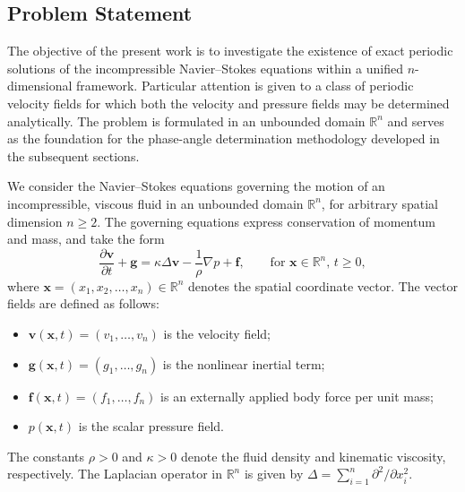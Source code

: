 \documentclass[11pt]{jfm}
\numberwithin{equation}{section}
\begin{document}
\subsection{Problem Statement}
The objective of the present work is to investigate the existence of exact periodic
solutions of the incompressible Navier--Stokes equations within a unified $n$-dimensional framework. Particular attention is given to a class of periodic velocity fields for which both the velocity and pressure fields may be determined analytically. The problem is formulated in an unbounded domain \( \mathbb{R}^n \) and serves as the foundation for the phase-angle determination methodology developed in the subsequent sections.

We consider the Navier--Stokes equations governing the motion of an incompressible, viscous fluid in an unbounded domain \( \mathbb{R}^n \), for arbitrary spatial dimension \( n \geq 2 \). The governing equations express conservation of momentum and mass, and take the form
\begin{equation}
\label{1.1}
\frac{\partial \boldsymbol{v}}{\partial t} + \boldsymbol{g} = \kappa \Delta \boldsymbol{v} - \frac{1}{\rho} \nabla p + \boldsymbol{f}, \qquad \text{for } \boldsymbol{x} \in \mathbb{R}^n, \, t \geq 0,
\end{equation}
where \( \boldsymbol{x} = (x_1, x_2, \dots, x_n) \in \mathbb{R}^n \) denotes the spatial coordinate vector. The vector fields are defined as follows:
\begin{itemize}
    \item \( \boldsymbol{v}(\boldsymbol{x}, t) = (v_1, \dots, v_n) \) is the velocity field;
    \item \( \boldsymbol{g}(\boldsymbol{x}, t) = (g_1, \dots, g_n) \) is the nonlinear inertial term;
    \item \( \boldsymbol{f}(\boldsymbol{x}, t) = (f_1, \dots, f_n) \) is an externally applied body force per unit mass;
    \item \( p(\boldsymbol{x}, t) \) is the scalar pressure field.
\end{itemize}
The constants \( \rho > 0 \) and \( \kappa > 0 \) denote the fluid density and kinematic viscosity, respectively. The Laplacian operator in \( \mathbb{R}^n \) is given by \( \Delta = \sum_{i=1}^n \partial^2 / \partial x_i^2 \).
\end{document}
